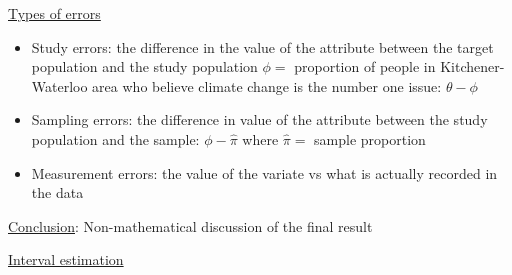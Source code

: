 \underline{Types of errors}
\begin{itemize}
    \item Study errors: the difference in the value of the attribute between
          the target population and the study population
          \subitem $ \phi= $ proportion of people in Kitchener-Waterloo area who
          believe climate change is the number one issue: $ \theta-\phi $
    \item Sampling errors: the difference in value of the attribute between the study
          population and the sample: $ \phi-\hat{\pi} $ where $ \hat{\pi}= $
          sample proportion
    \item Measurement errors: the value of the variate vs what is actually recorded
          in the data
\end{itemize}
\underline{Conclusion}: Non-mathematical discussion of the final result

\underline{Interval estimation}

